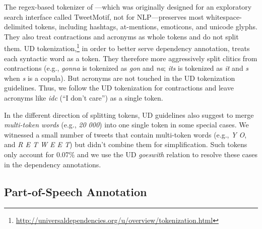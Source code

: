 \documentclass[11pt,a4paper]{article}
\newcommand{\yjcomment}[1]{\textcolor{orange}{[$_\mathrm{L}^\mathrm{Y}$#1]}}
\newcommand{\nascomment}[1]{\textcolor{blue}{[#1 ---\textsc{nas}]}}
\newcommand{\yicomment}[1]{\textcolor{gray}{[#1 ---\textsc{yi}]}}
\begin{document}
The regex-based tokenizer of \citet{ICWSM101540}---which was 
originally designed for an exploratory search interface called
TweetMotif, not for NLP---preserves most whitespace-delimited tokens, including 
hashtags, at-mentions, emoticons, and unicode glyphs. 
They also treat contractions and acronyms as whole tokens and do not split them.
UD
tokenization,\footnote{\url{http://universaldependencies.org/u/overview/tokenization.html}}
in order to better serve dependency annotation, treats each syntactic word as a token.
They therefore more aggressively split
clitics from contractions (e.g., {\it  gonna} is tokenized as {\it gon} and {\it na}; {\it its}
is tokenized as {\it it} and {\it s} when {\it s} is a copula).
But acronyms are not touched
in the UD tokenization guidelines. Thus, we follow the UD tokenization for contractions
and leave acronyms like {\em idc} (``I don't care'') as a single token. 

In the different direction of splitting tokens, UD guidelines also suggest to merge
{\it multi-token words} (e.g., {\it 20 000}) into one single token in some special
cases. We witnessed a small number of tweets that contain multi-token words
(e.g., {\it Y O}, and {\it R E T W E E T}) but didn't combine them for simplification.
Such tokens only account for 0.07\% and we use the UD
  {\it goeswith} relation to resolve these cases in the dependency annotations.

\subsection{Part-of-Speech Annotation}\label{sec:pos-anno}
\end{document}

